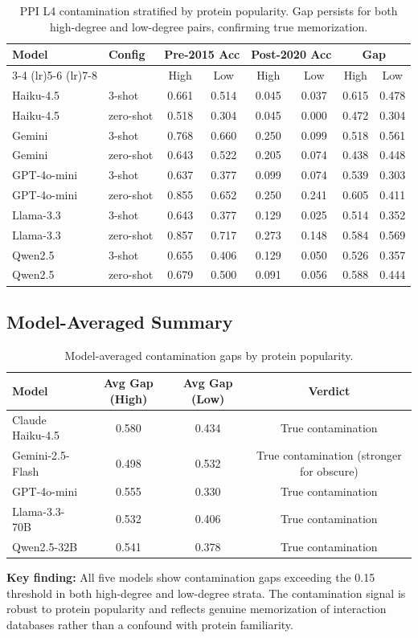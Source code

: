 \begin{table}[h]
\centering
\caption{PPI L4 contamination stratified by protein popularity. Gap persists for both high-degree and low-degree pairs, confirming true memorization.}
\label{tab:ppi_contam_popularity}
\scriptsize
\begin{tabular}{@{}llcccccc@{}}
\toprule
\textbf{Model} & \textbf{Config} & \multicolumn{2}{c}{\textbf{Pre-2015 Acc}} & \multicolumn{2}{c}{\textbf{Post-2020 Acc}} & \multicolumn{2}{c}{\textbf{Gap}} \\
\cmidrule(lr){3-4} \cmidrule(lr){5-6} \cmidrule(lr){7-8}
& & High & Low & High & Low & High & Low \\
\midrule
Haiku-4.5 & 3-shot & 0.661 & 0.514 & 0.045 & 0.037 & 0.615 & 0.478 \\
Haiku-4.5 & zero-shot & 0.518 & 0.304 & 0.045 & 0.000 & 0.472 & 0.304 \\
Gemini & 3-shot & 0.768 & 0.660 & 0.250 & 0.099 & 0.518 & 0.561 \\
Gemini & zero-shot & 0.643 & 0.522 & 0.205 & 0.074 & 0.438 & 0.448 \\
GPT-4o-mini & 3-shot & 0.637 & 0.377 & 0.099 & 0.074 & 0.539 & 0.303 \\
GPT-4o-mini & zero-shot & 0.855 & 0.652 & 0.250 & 0.241 & 0.605 & 0.411 \\
Llama-3.3 & 3-shot & 0.643 & 0.377 & 0.129 & 0.025 & 0.514 & 0.352 \\
Llama-3.3 & zero-shot & 0.857 & 0.717 & 0.273 & 0.148 & 0.584 & 0.569 \\
Qwen2.5 & 3-shot & 0.655 & 0.406 & 0.129 & 0.050 & 0.526 & 0.357 \\
Qwen2.5 & zero-shot & 0.679 & 0.500 & 0.091 & 0.056 & 0.588 & 0.444 \\
\bottomrule
\end{tabular}
\end{table}

\subsection{Model-Averaged Summary}

\begin{table}[h]
\centering
\caption{Model-averaged contamination gaps by protein popularity.}
\label{tab:ppi_contam_summary}
\scriptsize
\begin{tabular}{@{}lccc@{}}
\toprule
\textbf{Model} & \textbf{Avg Gap (High)} & \textbf{Avg Gap (Low)} & \textbf{Verdict} \\
\midrule
Claude Haiku-4.5 & 0.580 & 0.434 & True contamination \\
Gemini-2.5-Flash & 0.498 & 0.532 & True contamination (stronger for obscure) \\
GPT-4o-mini & 0.555 & 0.330 & True contamination \\
Llama-3.3-70B & 0.532 & 0.406 & True contamination \\
Qwen2.5-32B & 0.541 & 0.378 & True contamination \\
\bottomrule
\end{tabular}
\end{table}

\textbf{Key finding:} All five models show contamination gaps exceeding the 0.15 threshold in both high-degree and low-degree strata. The contamination signal is robust to protein popularity and reflects genuine memorization of interaction databases rather than a confound with protein familiarity.
